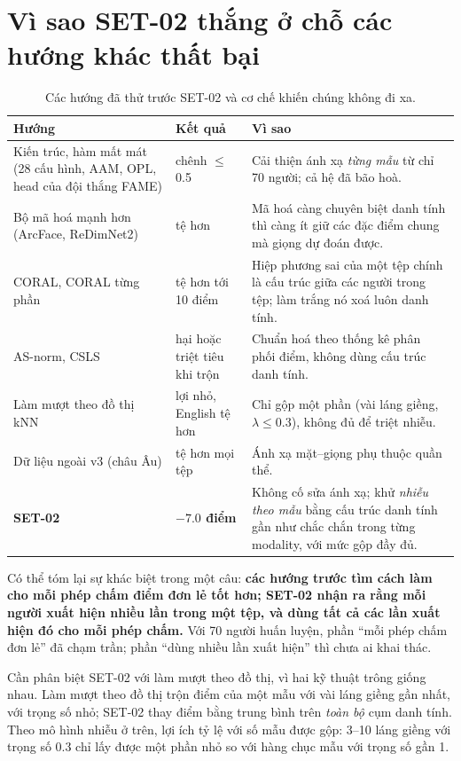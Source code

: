 \documentclass[11pt,a4paper]{article}
\newcommand{\key}[1]{\textbf{\color{accent}#1}}
\begin{document}
\section{Vì sao SET-02 thắng ở chỗ các hướng khác thất bại}
\label{sec:why-others}

\begin{table}[h]
\centering
\small
\caption{Các hướng đã thử trước SET-02 và cơ chế khiến chúng không đi xa.}
\begin{tabular}{>{\raggedright}p{3.6cm}>{\raggedright}p{3.2cm}>{\raggedright\arraybackslash}p{7.2cm}}
\toprule
Hướng & Kết quả & Vì sao \\
\midrule
Kiến trúc, hàm mất mát (28 cấu hình, AAM, OPL, head của đội thắng FAME) & chênh $\le$ 0.5 & Cải thiện ánh xạ \emph{từng mẫu} từ chỉ 70 người; cả hệ đã bão hoà. \\
Bộ mã hoá mạnh hơn (ArcFace, ReDimNet2) & tệ hơn & Mã hoá càng chuyên biệt danh tính thì càng ít giữ các đặc điểm chung mà giọng dự đoán được. \\
CORAL, CORAL từng phần & tệ hơn tới 10 điểm & Hiệp phương sai của một tệp chính là cấu trúc giữa các người trong tệp; làm trắng nó xoá luôn danh tính. \\
AS-norm, CSLS & hại hoặc triệt tiêu khi trộn & Chuẩn hoá theo thống kê phân phối điểm, không dùng cấu trúc danh tính. \\
Làm mượt theo đồ thị kNN & lợi nhỏ, English tệ hơn & Chỉ gộp một phần (vài láng giềng, $\lambda\le0.3$), không đủ để triệt nhiễu. \\
Dữ liệu ngoài v3 (châu Âu) & tệ hơn mọi tệp & Ánh xạ mặt--giọng phụ thuộc quần thể. \\
\midrule
\textbf{SET-02} & \textbf{$-7.0$ điểm} & Không cố sửa ánh xạ; khử \emph{nhiễu theo mẫu} bằng cấu trúc danh tính gần như chắc chắn trong từng modality, với mức gộp đầy đủ. \\
\bottomrule
\end{tabular}
\end{table}

Có thể tóm lại sự khác biệt trong một câu: \key{các hướng trước tìm cách làm cho mỗi phép chấm điểm đơn lẻ tốt hơn; SET-02 nhận ra rằng mỗi người xuất hiện nhiều lần trong một tệp, và dùng tất cả các lần xuất hiện đó cho mỗi phép chấm.} Với 70 người huấn luyện, phần ``mỗi phép chấm đơn lẻ'' đã chạm trần; phần ``dùng nhiều lần xuất hiện'' thì chưa ai khai thác.

Cần phân biệt SET-02 với làm mượt theo đồ thị, vì hai kỹ thuật trông giống nhau. Làm mượt theo đồ thị trộn điểm của một mẫu với vài láng giềng gần nhất, với trọng số nhỏ; SET-02 thay điểm bằng trung bình trên \emph{toàn bộ} cụm danh tính. Theo mô hình nhiễu ở trên, lợi ích tỷ lệ với số mẫu được gộp: 3--10 láng giềng với trọng số 0.3 chỉ lấy được một phần nhỏ so với hàng chục mẫu với trọng số gần 1.
\end{document}
